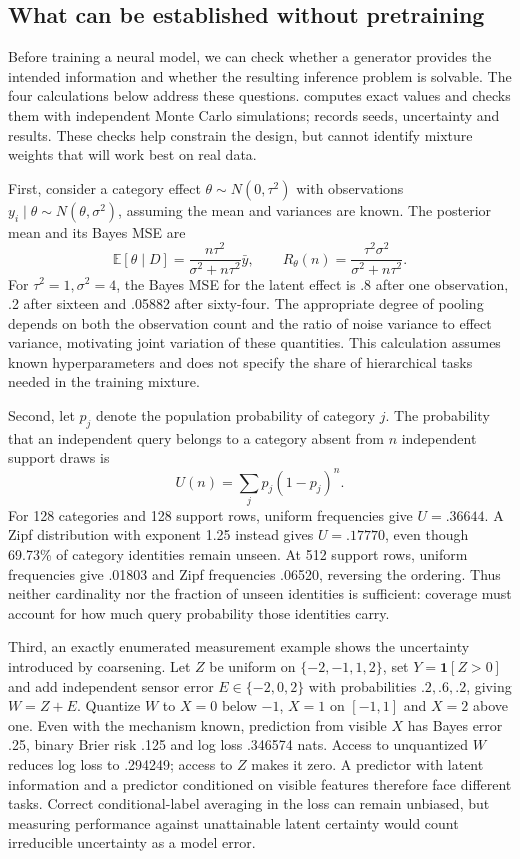 \documentclass[11pt]{article}
\newcommand{\E}{\mathbb{E}}
\newcommand{\ind}{\mathbf{1}}
\begin{document}
\subsection{What can be established without pretraining}

Before training a neural model, we can check whether a generator provides the intended information and whether the resulting inference problem is solvable. The four calculations below address these questions.  computes exact values and checks them with independent Monte Carlo simulations;  records seeds, uncertainty and results. These checks help constrain the design, but cannot identify mixture weights that will work best on real data.

First, consider a category effect $\theta\sim N(0,\tau^2)$ with observations $y_i\mid\theta\sim N(\theta,\sigma^2)$, assuming the mean and variances are known. The posterior mean and its Bayes MSE are
\[
 \E[\theta\mid D]=\frac{n\tau^2}{\sigma^2+n\tau^2}\bar y,
 \qquad R_\theta(n)=\frac{\tau^2\sigma^2}{\sigma^2+n\tau^2}.
\]
For $\tau^2=1,\sigma^2=4$, the Bayes MSE for the latent effect is .8 after one observation, .2 after sixteen and .05882 after sixty-four. The appropriate degree of pooling depends on both the observation count and the ratio of noise variance to effect variance, motivating joint variation of these quantities. This calculation assumes known hyperparameters and does not specify the share of hierarchical tasks needed in the training mixture.

Second, let $p_j$ denote the population probability of category $j$. The probability that an independent query belongs to a category absent from $n$ independent support draws is
\[
 U(n)=\sum_j p_j(1-p_j)^n.
\]
For 128 categories and 128 support rows, uniform frequencies give $U=.36644$. A Zipf distribution with exponent 1.25 instead gives $U=.17770$, even though 69.73\% of category identities remain unseen. At 512 support rows, uniform frequencies give .01803 and Zipf frequencies .06520, reversing the ordering. Thus neither cardinality nor the fraction of unseen identities is sufficient: coverage must account for how much query probability those identities carry.

Third, an exactly enumerated measurement example shows the uncertainty introduced by coarsening. Let $Z$ be uniform on $\{-2,-1,1,2\}$, set $Y=\ind[Z>0]$ and add independent sensor error $E\in\{-2,0,2\}$ with probabilities $.2,.6,.2$, giving $W=Z+E$. Quantize $W$ to $X=0$ below $-1$, $X=1$ on $[-1,1]$ and $X=2$ above one. Even with the mechanism known, prediction from visible $X$ has Bayes error .25, binary Brier risk .125 and log loss .346574 nats. Access to unquantized $W$ reduces log loss to .294249; access to $Z$ makes it zero. A predictor with latent information and a predictor conditioned on visible features therefore face different tasks. Correct conditional-label averaging in the loss can remain unbiased, but measuring performance against unattainable latent certainty would count irreducible uncertainty as a model error.
\end{document}
